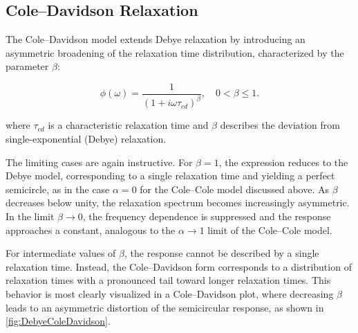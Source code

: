 \subsection{Cole--Davidson Relaxation}

The Cole--Davidson model extends Debye relaxation by introducing an asymmetric broadening of the relaxation time distribution, characterized by the parameter $\beta$:

\begin{equation}
	\phi(\omega) = \frac{1}{(1 + i\omega\tau_{cd})^{\beta}}, \quad 0 < \beta \le 1.
	\label{eqn:ColeDavidson}
\end{equation}

\noindent where $\tau_{cd}$ is a characteristic relaxation time and $\beta$ describes the deviation from single-exponential (Debye) relaxation.

The limiting cases are again instructive. For $\beta = 1$, the expression reduces to the Debye model, corresponding to a single relaxation time and yielding a perfect semicircle, as in the case $\alpha = 0$ for the Cole--Cole model discussed above. As $\beta$ decreases below unity, the relaxation spectrum becomes increasingly asymmetric. In the limit $\beta \rightarrow 0$, the frequency dependence is suppressed and the response approaches a constant, analogous to the $\alpha \rightarrow 1$ limit of the Cole--Cole model.

For intermediate values of $\beta$, the response cannot be described by a single relaxation time. Instead, the Cole--Davidson form corresponds to a distribution of relaxation times with a pronounced tail toward longer relaxation times. This behavior is most clearly visualized in a Cole--Davidson plot, where decreasing $\beta$ leads to an asymmetric distortion of the semicircular response, as shown in \fig\nolinebreak\ref{fig:DebyeColeDavidson}.

